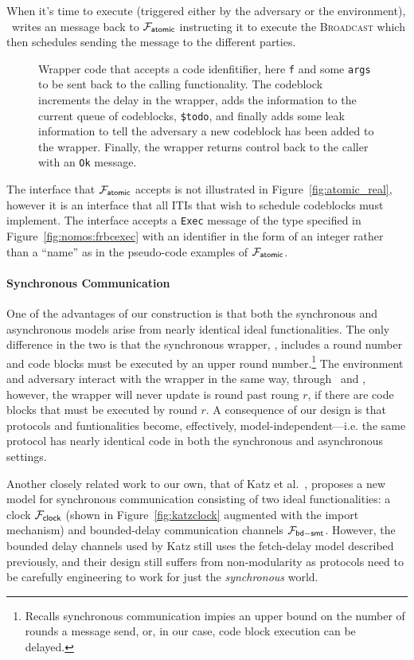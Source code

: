 When it's time to execute (triggered either by the adversary or the environment), \Wasync~writes an \Exec message back to $\mathcal{F}_{{\mathsf {atomic}}}$ instructing it to execute the \textsc{Broadcast} which then schedules sending the message to the different parties. 

\begin{figure}[!ht]

\caption{Wrapper code that accepts a code idenfitifier, here \texttt{f} and some \texttt{args} to be sent back to the calling functionality. The codeblock increments the delay in the wrapper, adds the information to the current queue of codeblocks, \texttt{\$todo}, and finally adds some leak information to tell the adversary a new codeblock has been added to the wrapper. Finally, the wrapper returns control back to the caller with an \texttt{Ok} message.}
\label{fig:wrapper:schedule}
\end{figure}

The \Exec interface that $\mathcal{F}_{{\mathsf {atomic}}}$ accepts is not illustrated in Figure~\ref{fig:atomic_real}, however it is an interface that all ITIs that wish to schedule codeblocks must implement.
The interface accepts a \texttt{Exec} message of the type specified in Figure~\ref{fig:nomos:frbcexec} with an identifier in the form of an integer rather than a ``name'' as in the pseudo-code examples of $\mathcal{F}_{{\mathsf {atomic}}}$.

\paragraph{Synchronous Communication}
One of the advantages of our construction is that both the synchronous and asynchronous models arise from nearly identical ideal functionalities.
The only difference in the two is that the synchronous wrapper, \Wsync, includes a round number and code blocks must be executed by an upper round number.\footnote{Recalls synchronous communication impies an upper bound on the number of rounds a message send, or, in our case, code block execution can be delayed.}
The environment and adversary interact with the wrapper in the same way, through \Advance~and \Exec, however, the wrapper will never update is round past roung $r$, if there are code blocks that must be executed by round $r$.
A consequence of our design is that protocols and funtionalities become, effectively, model-independent---i.e. the same protocol has nearly identical code in both the synchronous and asynchronous settings.

Another closely related work to our own, that of Katz et al.~\cite{katzuc}, proposes a new model for synchronous communication consisting of two ideal functionalities: a clock $\mathcal{F}_{{\mathsf {clock}}}$ (shown in Figure~\ref{fig:katzclock} augmented with the import mechanism) and bounded-delay communication channels $\mathcal{F}_{{\mathsf {bd-smt}}}$.
However, the bounded delay channels used by Katz still uses the fetch-delay model described previously, and their design still suffers from non-modularity as protocols need to be carefully engineering to work for just the \textit{synchronous} world.

